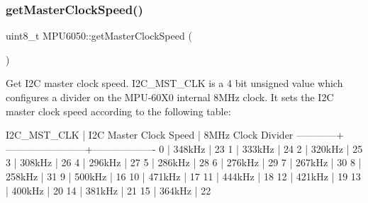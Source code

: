 \begin{DoxyCode}{0}

\end{DoxyCode}
\mbox{\label{classMPU6050_a4cda448ef5c5736bd14188947342d636}} 
\subsubsection{\texorpdfstring{getMasterClockSpeed()}{getMasterClockSpeed()}}
{\footnotesize\ttfamily uint8\+\_\+t M\+P\+U6050\+::get\+Master\+Clock\+Speed (\begin{DoxyParamCaption}{ }\end{DoxyParamCaption})}

Get I2C master clock speed. I2\+C\+\_\+\+M\+S\+T\+\_\+\+C\+LK is a 4 bit unsigned value which configures a divider on the M\+P\+U-\/60\+X0 internal 8M\+Hz clock. It sets the I2C master clock speed according to the following table\+:


\begin{DoxyPre}
I2C\_MST\_CLK | I2C Master Clock Speed | 8MHz Clock Divider
------------+------------------------+-------------------
0           | 348kHz                 | 23
1           | 333kHz                 | 24
2           | 320kHz                 | 25
3           | 308kHz                 | 26
4           | 296kHz                 | 27
5           | 286kHz                 | 28
6           | 276kHz                 | 29
7           | 267kHz                 | 30
8           | 258kHz                 | 31
9           | 500kHz                 | 16
10          | 471kHz                 | 17
11          | 444kHz                 | 18
12          | 421kHz                 | 19
13          | 400kHz                 | 20
14          | 381kHz                 | 21
15          | 364kHz                 | 22
\end{DoxyPre}


